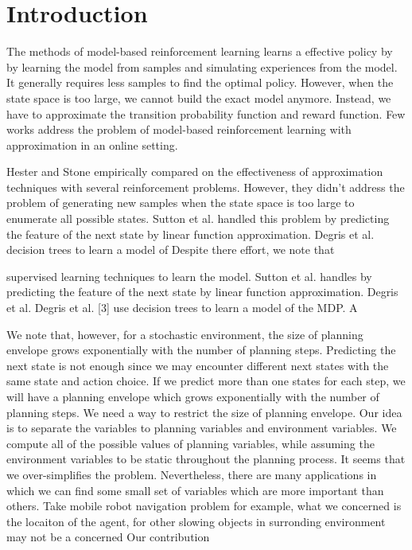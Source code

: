 \documentclass{article} %
\begin{document}

\section{Introduction}
The methods of model-based reinforcement learning learns a effective policy by 
by learning the model from samples and simulating experiences
from the model. It generally requires less samples to find the optimal policy. 
However, when the state space is too large, we cannot build the exact model anymore.
Instead, we have to approximate the transition probability function and 
reward function. Few works address the problem of model-based reinforcement learning
with approximation in an online setting.

Hester and Stone empirically compared on the effectiveness of 
approximation techniques with several reinforcement problems.
However, they didn't address the problem of generating 
new samples when the state space is too large to enumerate
all possible states.
Sutton et al. handled this problem by predicting the feature of the next state by linear function approximation.
Degris et al.  decision trees to learn a model of
Despite there effort, we note that 

supervised learning techniques to learn the model.
Sutton et al. handles by predicting the feature of the next state by linear function approximation.
Degris et al. 
Degris et al. [3] use decision trees to learn a model of
the MDP. A

We note that, however, for a stochastic environment, the size of planning envelope grows exponentially with the number of planning
steps. Predicting the next state is not enough since we may encounter different next states with the same state and action choice.
If we predict more than one states for each step, we will have a planning envelope which grows exponentially with the number of planning
steps. We need a way to restrict the size of planning envelope. Our idea is to separate the variables to planning variables 
and environment variables. We compute all of the possible values of planning variables, while assuming 
the environment variables to be static throughout the planning process.  
It seems that we over-simplifies the problem. Nevertheless, there are many applications
in which we can find some small set of variables which are more important than others. Take 
mobile robot navigation problem for example, 
what we concerned is the locaiton of the agent, 
for other slowing objects in surronding environment may not be a concerned 
Our contribution
\end{document}

